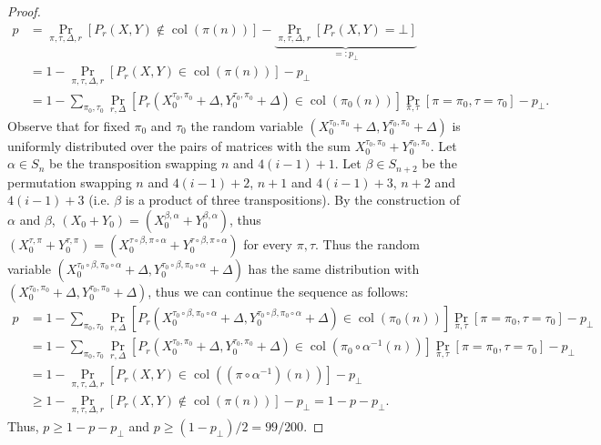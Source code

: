 \begin{proof}
\begin{align*}
p&=\Pr_{\pi,\tau,\Delta,r}[P_r(X,Y)\notin\operatorname{col}(\pi(n))]
-\underbrace{\Pr_{\pi,\tau,\Delta,r}[P_r(X,Y)=\bot]}_{=:p_\bot}\\
&=1-\Pr_{\pi,\tau,\Delta,r}[P_r(X,Y)\in\operatorname{col}(\pi(n))]-p_\bot\\
&=1-\sum_{\pi_0,\tau_0}\Pr_{r,\Delta}[P_r(X_0^{\tau_0,\pi_0}+\Delta,Y_0^{\tau_0,\pi_0}+\Delta)\in\operatorname{col}(\pi_0(n))]
\Pr_{\pi,\tau}[\pi=\pi_0,\tau=\tau_0]-p_\bot .
\end{align*}
Observe that for fixed $\pi_0$ and $\tau_0$ the random variable $(X_0^{\tau_0,\pi_0}+\Delta,Y_0^{\tau_0,\pi_0}+\Delta)$ is uniformly distributed over the pairs of matrices with the sum $X_0^{\tau_0,\pi_0}+Y_0^{\tau_0,\pi_0}$. Let $\alpha\in S_n$ be the transposition swapping $n$ and $4(i-1)+1$. Let $\beta\in S_{n+2}$ be the permutation swapping $n$ and $4(i-1)+2$, $n+1$ and $4(i-1)+3$, $n+2$ and $4(i-1)+3$ (i.e. $\beta$ is a product of three transpositions). By the construction of $\alpha$ and $\beta$, $(X_0+Y_0)=(X_0^{\beta,\alpha}+Y_0^{\beta,\alpha})$, thus $(X_0^{\tau,\pi}+Y_0^{\tau,\pi})=(X_0^{\tau\circ\beta,\pi\circ\alpha}+Y_0^{\tau\circ\beta,\pi\circ\alpha})$ for every $\pi,\tau$. Thus the random variable $(X_0^{\tau_0\circ\beta,\pi_0\circ\alpha}+\Delta,Y_0^{\tau_0\circ\beta,\pi_0\circ\alpha}+\Delta)$ has the same distribution with $(X_0^{\tau_0,\pi_0}+\Delta,Y_0^{\tau_0,\pi_0}+\Delta)$, thus we can continue the sequence as follows:
\begin{align*}
p&=1-\sum_{\pi_0,\tau_0}\Pr_{r,\Delta}[P_r(X_0^{\tau_0\circ\beta,\pi_0\circ\alpha}+\Delta,Y_0^{\tau_0\circ\beta,\pi_0\circ\alpha}+\Delta)\in\operatorname{col}(\pi_0(n))]\Pr_{\pi,\tau}[\pi=\pi_0,\tau=\tau_0]-p_\bot\\
&=1-\sum_{\pi_0,\tau_0}\Pr_{r,\Delta}[P_r(X_0^{\tau_0,\pi_0}+\Delta,Y_0^{\tau_0,\pi_0}+\Delta)\in\operatorname{col}(\pi_0\circ\alpha^{-1}(n))]\Pr_{\pi,\tau}[\pi=\pi_0,\tau=\tau_0]-p_\bot\\
&=1-\Pr_{\pi,\tau,\Delta,r}[P_r(X,Y)\in\operatorname{col}((\pi\circ\alpha^{-1})(n))]-p_\bot\\
&\ge1-\Pr_{\pi,\tau,\Delta,r}[P_r(X,Y)\notin\operatorname{col}(\pi(n))]-p_\bot=1-p-p_\bot .
\end{align*}
Thus, $p\ge1-p-p_\bot$ and $p\ge(1-p_\bot)/2=99/200$.
\end{proof}
